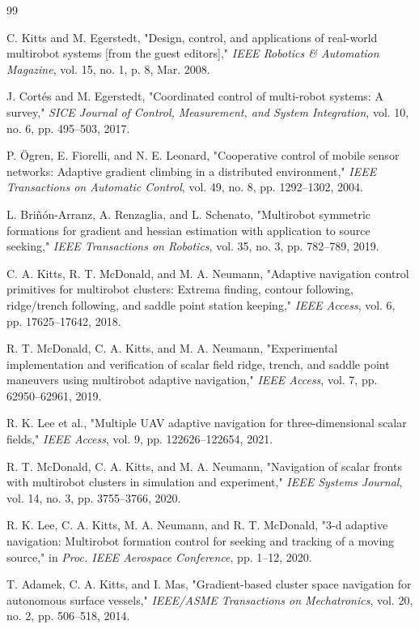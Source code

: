 \documentclass[lettersize,journal]{IEEEtran}
\begin{document}
\begin{thebibliography}{99}

 C. Kitts and M. Egerstedt, "Design, control, and applications of real-world multirobot systems [from the guest editors]," \textit{IEEE Robotics \& Automation Magazine}, vol. 15, no. 1, p. 8, Mar. 2008.

 J. Cortés and M. Egerstedt, "Coordinated control of multi-robot systems: A survey," \textit{SICE Journal of Control, Measurement, and System Integration}, vol. 10, no. 6, pp. 495--503, 2017.

 P. Ögren, E. Fiorelli, and N. E. Leonard, "Cooperative control of mobile sensor networks: Adaptive gradient climbing in a distributed environment," \textit{IEEE Transactions on Automatic Control}, vol. 49, no. 8, pp. 1292--1302, 2004.

 L. Briñón-Arranz, A. Renzaglia, and L. Schenato, "Multirobot symmetric formations for gradient and hessian estimation with application to source seeking," \textit{IEEE Transactions on Robotics}, vol. 35, no. 3, pp. 782--789, 2019.

 C. A. Kitts, R. T. McDonald, and M. A. Neumann, "Adaptive navigation control primitives for multirobot clusters: Extrema finding, contour following, ridge/trench following, and saddle point station keeping," \textit{IEEE Access}, vol. 6, pp. 17625--17642, 2018.

 R. T. McDonald, C. A. Kitts, and M. A. Neumann, "Experimental implementation and verification of scalar field ridge, trench, and saddle point maneuvers using multirobot adaptive navigation," \textit{IEEE Access}, vol. 7, pp. 62950--62961, 2019.

 R. K. Lee et al., "Multiple UAV adaptive navigation for three-dimensional scalar fields," \textit{IEEE Access}, vol. 9, pp. 122626--122654, 2021.

 R. T. McDonald, C. A. Kitts, and M. A. Neumann, "Navigation of scalar fronts with multirobot clusters in simulation and experiment," \textit{IEEE Systems Journal}, vol. 14, no. 3, pp. 3755--3766, 2020.

 R. K. Lee, C. A. Kitts, M. A. Neumann, and R. T. McDonald, "3-d adaptive navigation: Multirobot formation control for seeking and tracking of a moving source," in \textit{Proc. IEEE Aerospace Conference}, pp. 1--12, 2020.

 T. Adamek, C. A. Kitts, and I. Mas, "Gradient-based cluster space navigation for autonomous surface vessels," \textit{IEEE/ASME Transactions on Mechatronics}, vol. 20, no. 2, pp. 506--518, 2014.


\end{thebibliography}
\end{document}
